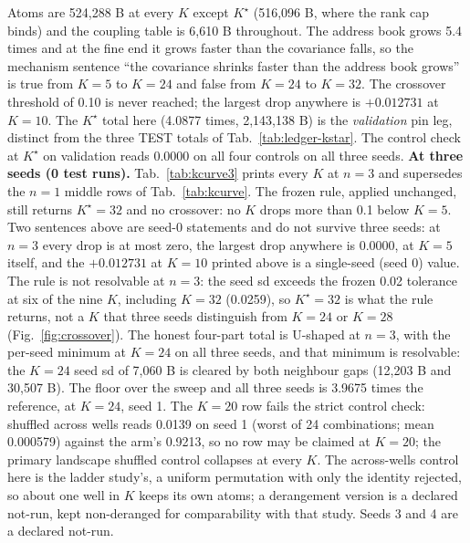 \documentclass{article} %
\newcommand{\Kstar}{\ensuremath{K^{\star}}}
\begin{document}
\noindent Atoms are 524,288 B at every $K$ except $\Kstar$ (516,096 B, where the rank cap binds) and
the coupling table is 6,610 B throughout. The address book grows 5.4 times and at the fine end it
grows faster than the covariance falls, so the mechanism sentence ``the covariance shrinks faster
than the address book grows'' is true from $K=5$ to $K=24$ and false from $K=24$ to $K=32$. The
crossover threshold of 0.10 is never reached; the largest drop anywhere is $+0.012731$ at $K=10$.
The $\Kstar$ total here (4.0877 times, 2,143,138 B) is the \emph{validation} pin leg, distinct from
the three TEST totals of Tab.~\ref{tab:ledger-kstar}. %
The control check at $\Kstar$ on validation reads 0.0000 on all four controls on all three seeds.
\textbf{At three seeds (0 test runs).} Tab.~\ref{tab:kcurve3} prints
every $K$ at $n=3$ and supersedes the $n=1$ middle rows of Tab.~\ref{tab:kcurve}.
The frozen rule, applied unchanged, still returns $\Kstar=32$ and no crossover: no $K$ drops more
than 0.1 below $K=5$. Two sentences above are seed-0 statements and do not survive three seeds: at
$n=3$ every drop is at most zero, the largest drop anywhere is 0.0000, at $K=5$ itself, and the
$+0.012731$ at $K=10$ printed above is a single-seed (seed 0) value. The rule is not resolvable at $n=3$: the seed sd
exceeds the frozen 0.02 tolerance at six of the nine $K$, including $K=32$ (0.0259), so $\Kstar=32$
is what the rule returns, not a $K$ that three seeds distinguish from $K=24$ or $K=28$ (Fig.~\ref{fig:crossover}). The honest
four-part total is U-shaped at $n=3$, with the per-seed minimum at $K=24$ on all three seeds, and
that minimum is resolvable: the $K=24$ seed sd of 7,060 B is cleared by both neighbour gaps (12,203
B and 30,507 B). The floor over the sweep and all three seeds is 3.9675 times the reference, at
$K=24$, seed 1. The $K=20$ row fails the strict control check:
shuffled across wells reads 0.0139 on seed 1 (worst of 24 combinations; mean
0.000579) against the arm's 0.9213, so no row may be claimed at $K=20$; the primary
landscape shuffled control collapses at every $K$. The across-wells control here is
the ladder study's, a uniform permutation with only the identity rejected, so about one well in $K$ keeps its
own atoms; a derangement version is a declared not-run, kept non-deranged for comparability with
that study. Seeds 3 and 4 are a declared not-run.
\end{document}

